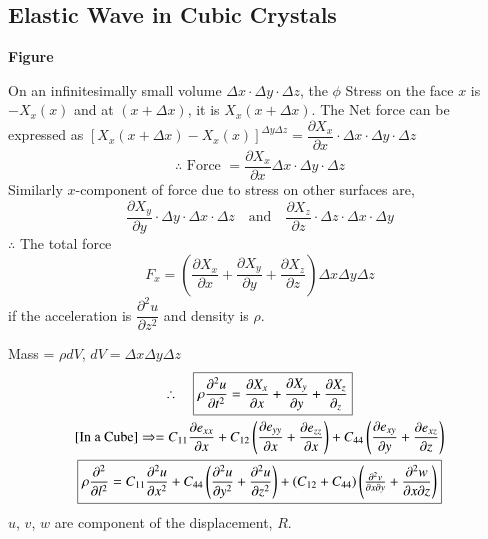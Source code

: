 \chapter[Lecture 17]{}\label{lec17}

\section*{Elastic Wave in Cubic Crystals}
\begin{center}
{\bf Figure}
\end{center}
On an infinitesimally small volume $\Delta x \cdot \Delta y \cdot \Delta z$, the $\phi$ Stress on the face $x$ is $-X_{x}(x)$ and at $(x+\Delta x)$, it is $X_{x}(x+\Delta x)$. The Net force can be expressed as $[X_{x}(x+\Delta x)-X_{x}(x)]^{\Delta y\Delta z}=\dfrac{\partial X_{x}}{\partial x} \cdot \Delta x \cdot \Delta y \cdot \Delta z$
$$
\therefore \text{ Force } =\dfrac{\partial X_{x}}{\partial x}\Delta x \cdot \Delta y \cdot \Delta z
$$
Similarly $x$-component of force due to stress on other surfaces are,
$$
\frac{\partial X_{y}}{\partial y}\cdot \Delta y\cdot \Delta x\cdot \Delta z\quad \text{and}\quad \frac{\partial X_{z}}{\partial z}\cdot \Delta z\cdot \Delta x\cdot \Delta y
$$
$\therefore$ The total force
$$
F_{x}=\left(\frac{\partial X_{x}}{\partial x}+\frac{\partial X_{y}}{\partial y}+\frac{\partial X_{z}}{\partial z}\right)\Delta x \Delta y \Delta z
$$
if the acceleration is $\dfrac{\partial^{2}u}{\partial z^{2}}$ and density is $\rho$.

Mass = $\rho dV$, $dV=\Delta x \Delta y \Delta z$
\begin{gather*}
\therefore\quad \fbox{$\rho \dfrac{\partial^{2}u}{\partial t^{2}}=\dfrac{\partial X_{x}}{\partial x}+\dfrac{\partial X_{y}}{\partial y}+\dfrac{\partial X_{z}}{\partial_{z}}$}\\
\text{[In a Cube]}\Rightarrow = C_{11}\dfrac{\partial e_{xx}}{\partial x}+C_{12}\left(\dfrac{\partial e_{yy}}{\partial x}+\dfrac{\partial e_{zz}}{\partial x}\right)+C_{44}\left(\dfrac{\partial e_{xy}}{\partial y}+\dfrac{\partial e_{xz}}{\partial z}\right)\\
\fbox{$\rho \dfrac{\partial^{2}}{\partial l^{2}}=C_{11}\dfrac{\partial^{2}u}{\partial x^{2}}+C_{44}\left(\dfrac{\partial^{2}u}{\partial y^{2}}+\dfrac{\partial^{2}u}{\partial z^{2}}\right)+(C_{12}+C_{44})\left(\frac{\partial^{2}v}{\partial x\partial y}+\dfrac{\partial^{2}w}{\partial x\partial z}\right)$}
\end{gather*}
$u$, $v$, $w$ are component of the displacement, $R$.

